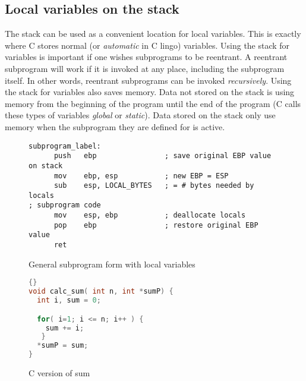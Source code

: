 

\subsection{Local variables on the stack}

The stack can be used as a convenient location for local variables. This is
exactly where C stores normal (or \emph{automatic} in C lingo) variables.
Using the stack for variables is important if one wishes subprograms to be
reentrant. A reentrant subprogram will work if it is invoked at any place,
including the subprogram itself. In other words, reentrant subprograms
can be invoked \emph{recursively}. Using the stack for variables also saves
memory. Data not stored on the stack is using memory from the beginning of
the program until the end of the program (C calls these types of variables
\emph{global} or \emph{static}). Data stored on the stack only use memory
when the subprogram they are defined for is active.

\begin{figure}[t]
 \begin{lstlisting}[language={[x86masm]Assembler}]
subprogram_label:
      push   ebp                ; save original EBP value on stack
      mov    ebp, esp           ; new EBP = ESP
      sub    esp, LOCAL_BYTES   ; = # bytes needed by locals
; subprogram code
      mov    esp, ebp           ; deallocate locals
      pop    ebp                ; restore original EBP value
      ret
\end{lstlisting}
\caption{General subprogram form with local variables\label{fig:subskel2}}
\end{figure}

\begin{figure}[t]
\begin{lstlisting}[language=C++,frame=tlrb]{}
void calc_sum( int n, int *sumP) {
  int i, sum = 0;

  for( i=1; i <= n; i++ ) {
    sum += i;
   }
  *sumP = sum;
}
\end{lstlisting}
\caption{C version of sum \label{fig:Csum}}
\end{figure}

